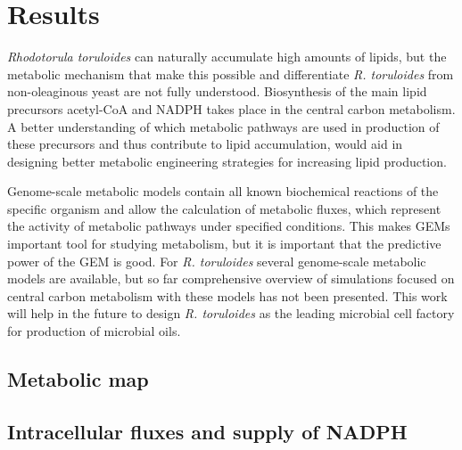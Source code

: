 \chapter{Results}





\textit{Rhodotorula toruloides} can naturally accumulate high amounts of lipids, but the 
metabolic mechanism that make this possible and differentiate \textit{R. toruloides} from non-oleaginous yeast are not fully understood.
Biosynthesis of the main lipid precursors acetyl-CoA and NADPH takes place in the central carbon metabolism. A better understanding of which 
metabolic pathways are used in production of these precursors and thus contribute to lipid accumulation, would aid in designing better 
metabolic engineering strategies for increasing lipid production.

Genome-scale metabolic models contain all known biochemical reactions of the specific organism and allow the calculation of
metabolic fluxes, which represent the activity of metabolic pathways under specified conditions. 
This makes GEMs important tool for studying metabolism, but it is important that the predictive power of the GEM is
good. For \textit{R. toruloides} several genome-scale metabolic models are available, but so far comprehensive overview of 
simulations focused on central carbon metabolism with these models has not been presented.
This work will help in the future to design \textit{R. toruloides} as the leading microbial cell factory for production of microbial oils.


\section{Metabolic map} %


\section{Intracellular fluxes and supply of NADPH} %


